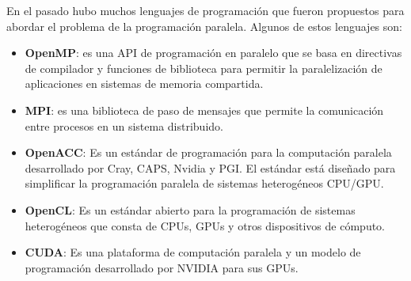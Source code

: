 En el pasado hubo muchos lenguajes de programación que fueron propuestos para abordar el problema de la programación
paralela. Algunos de estos lenguajes son:

\begin{itemize}
  \item \textbf{OpenMP}: es una API de programación en paralelo que se basa en directivas de compilador y funciones de
    biblioteca para permitir la paralelización de aplicaciones en sistemas de memoria compartida.
  \item \textbf{MPI}: es una biblioteca de paso de mensajes que permite la comunicación entre procesos en un sistema
    distribuido.
  \item \textbf{OpenACC}: Es un estándar de programación para la computación paralela desarrollado por Cray, CAPS,
    Nvidia y PGI. El estándar está diseñado para simplificar la programación paralela de sistemas heterogéneos CPU/GPU.
  \item \textbf{OpenCL}: Es un estándar abierto para la programación de sistemas heterogéneos que consta de CPUs, GPUs y
    otros dispositivos de cómputo.
  \item \textbf{CUDA}: Es una plataforma de computación paralela y un modelo de programación desarrollado por NVIDIA para
    sus GPUs.
\end{itemize}





